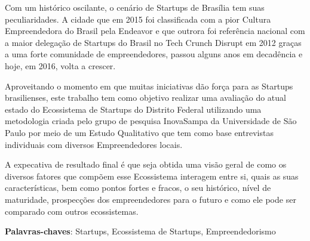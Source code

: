 \begin{resumo}

Com um histórico oscilante, o cenário de Startups de Brasília tem suas peculiaridades. A cidade que em 2015 foi classificada com a pior Cultura Empreendedora do Brasil pela Endeavor e que outrora foi referência nacional com a maior delegação de Startups do Brasil no Tech Crunch Disrupt em 2012 graças a uma forte comunidade de empreendedores, passou alguns anos em decadência e hoje, em 2016, volta a crescer.

Aproveitando o momento em que muitas iniciativas dão força para as Startups brasilienses, este trabalho tem como objetivo realizar uma avaliação do atual estado do Ecossistema de Startups do Distrito Federal utilizando uma metodologia criada pelo grupo de pesquisa InovaSampa da Universidade de São Paulo por meio de um Estudo Qualitativo que tem como base entrevistas individuais com diversos Empreendedores locais.

A expecativa de resultado final é que seja obtida uma visão geral de como os diversos fatores que compõem esse Ecossistema interagem entre si, quais as suas características, bem como pontos fortes e fracos, o seu histórico, nível de maturidade, prospecções dos empreendedores para o futuro e como ele pode ser comparado com outros ecossistemas.

 \vspace{\onelineskip}

 \noindent
 \textbf{Palavras-chaves}: Startups, Ecossistema de Startups, Empreendedorismo
\end{resumo}
